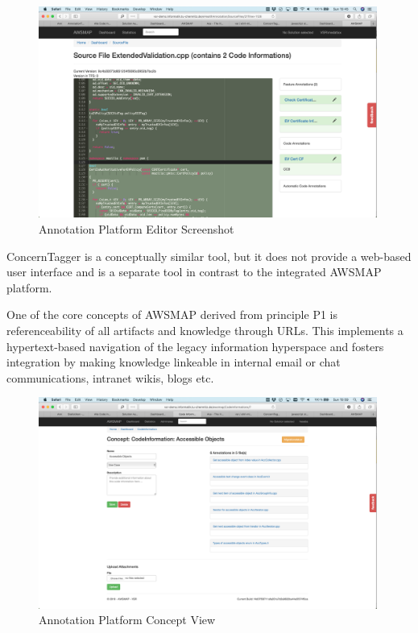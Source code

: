 \begin{figure}
\hypertarget{fig:awsmap.editor}{%
\centering
\includegraphics[width=0.99\textwidth]{../figures/screenshots/ap-editor.png}
\caption{Annotation Platform Editor Screenshot}\label{fig:awsmap.editor}
}
\end{figure}

ConcernTagger \autocite{Eaddy2008aConcernTagger} is a conceptually similar tool, but it does not provide a web-based user interface and is a separate tool in contrast to the integrated AWSMAP platform.

One of the core concepts of AWSMAP derived from principle P1 is referenceability of all artifacts and knowledge through URLs.
This implements a hypertext-based navigation of the legacy information hyperspace \autocite{Tilley1996ProgramUnderstanding} and fosters integration by making knowledge linkeable in internal email or chat communications, intranet wikis, blogs etc.

\begin{figure}
\hypertarget{fig:awsmap.concept}{%
\centering
\includegraphics[width=0.99\textwidth]{../figures/screenshots/ap-concept.png}
\caption{Annotation Platform Concept View}\label{fig:awsmap.concept}
}
\end{figure}

